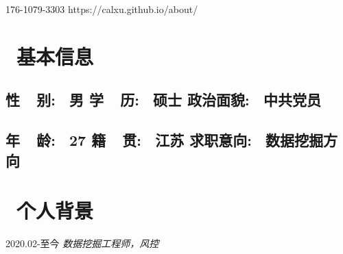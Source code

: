 \documentclass{resume}
\begin{document}











\medskip

    {176-1079-3303}    {https://calxu.github.io/about/} 










\section{   \faHome  \  基本信息}
   \subsection{  \hspace{ 0.4cm }     \textbf{性\ \ 别}:    \ 男   
                        \hspace{ 3.2cm }     \textbf{学\ \ 历}:   \ 硕士 
                        \hspace{ 3.2cm }     \textbf{政治面貌}: \ 中共党员 }

   \subsection{  \hspace{ 0.4cm }     \textbf{年\ \ 龄}:     \ 27   
                        \hspace{ 3.2cm }     \textbf{籍\ \ 贯}:     \ 江苏 
                        \hspace{ 3.2cm }     \textbf{求职意向}:  \ 数据挖掘方向 }
  
\medskip










\section{   \faUser    \  个人背景}

                                             {2020.02-至今}
   \faUserMd   \textit{   数据挖掘工程师，风控 }
\end{document}
